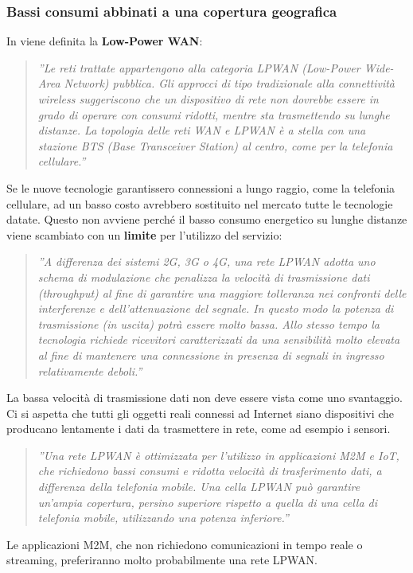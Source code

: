 \documentclass[a4paper]{report} %
\begin{document}
\subsubsection{Bassi consumi abbinati a una copertura geografica}
In \cite{art:rif.23} viene definita la \textbf{Low-Power WAN}:
\begin{quote}
	\textit{''Le reti trattate appartengono alla categoria LPWAN (Low-Power Wide-Area Network) pubblica. Gli approcci di tipo tradizionale alla connettività wireless suggeriscono che un dispositivo di rete non dovrebbe essere in grado di operare con consumi ridotti, mentre sta trasmettendo su lunghe distanze. La topologia delle reti WAN e LPWAN è a stella con una stazione BTS (Base Transceiver Station) al centro, come per la telefonia cellulare.''} 
\end{quote}	
Se le nuove tecnologie garantissero connessioni a lungo raggio, come la telefonia cellulare, ad un basso costo avrebbero sostituito nel mercato tutte le tecnologie datate. Questo non avviene perché il basso consumo energetico su lunghe distanze viene scambiato con un \textbf{limite} per l'utilizzo del servizio:
\begin{quote}
	\textit{''A differenza dei sistemi 2G, 3G o 4G, una rete LPWAN adotta uno schema di modulazione che penalizza la velocità di trasmissione dati (throughput) al fine di garantire una maggiore tolleranza nei confronti delle interferenze e dell'attenuazione del segnale. In questo modo la potenza di trasmissione (in uscita) potrà essere molto bassa. Allo stesso tempo la tecnologia richiede ricevitori caratterizzati da una sensibilità molto elevata al fine di mantenere una connessione in presenza di segnali in ingresso relativamente deboli.''}
\end{quote}
La bassa velocità di trasmissione dati non deve essere vista come uno svantaggio. Ci si aspetta che tutti gli oggetti reali connessi ad Internet siano dispositivi che producano lentamente i dati da trasmettere in rete, come ad esempio i sensori.
\begin{quote}	
	\textit{''Una rete LPWAN è ottimizzata per l'utilizzo in applicazioni M2M e IoT, che richiedono bassi consumi e ridotta velocità di trasferimento dati, a differenza della telefonia mobile. Una cella LPWAN può garantire un'ampia copertura, persino superiore rispetto a quella di una cella di telefonia mobile, utilizzando una potenza inferiore.''}
\end{quote}
Le applicazioni M2M, che non richiedono comunicazioni in tempo reale o streaming, preferiranno molto probabilmente una rete LPWAN.
\end{document}

